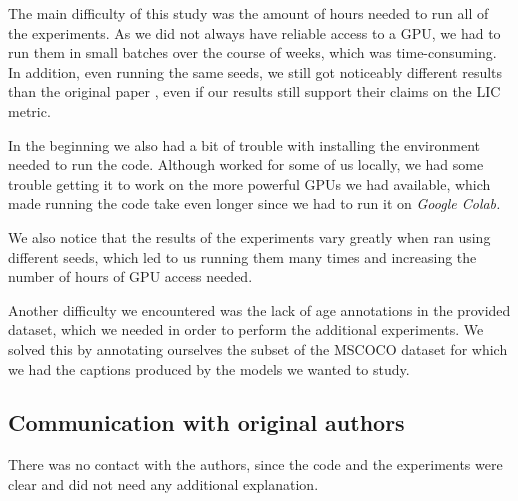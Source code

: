 The main difficulty of this study was the amount of hours needed to run all of the experiments. As we did not always have reliable access to a GPU, we had to run them in small batches over the course of weeks, which was time-consuming. In addition, even running the same seeds, we still got noticeably different results than the original paper \cite{Hirota2022}, even if our results still support their claims on the LIC metric.

In the beginning we also had a bit of trouble with installing the environment needed to run the code. Although worked for some of us locally, we had some trouble getting it to work on the more powerful GPUs we had available, which made running the code take even longer since we had to run it on \it Google Colab\rm.

We also notice that the results of the experiments vary greatly when ran using different seeds, which led to us running them many times and increasing the number of hours of GPU access needed. 

Another difficulty we encountered was the lack of age annotations in the provided dataset, which we needed in order to perform the additional experiments. We solved this by annotating ourselves the subset of the MSCOCO dataset \cite{MSCOCO} for which we had the captions produced by the models we wanted to study.

\subsection{Communication with original authors}

 There was no contact with the authors, since the code and the experiments were clear and did not need any additional explanation. 
